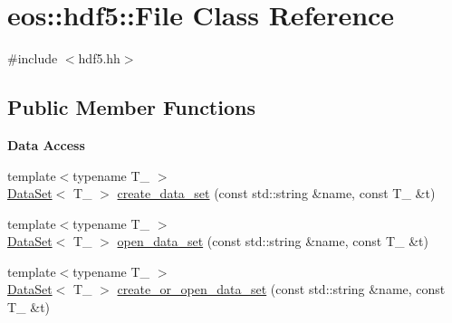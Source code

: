 \hypertarget{classeos_1_1hdf5_1_1File}{
\section{eos::hdf5::File Class Reference}
\label{classeos_1_1hdf5_1_1File}
}


{\ttfamily \#include $<$hdf5.hh$>$}\subsection*{Public Member Functions}
\begin{Indent}{\bf Data Access}\par
{\em \label{_amgrpf8aacfa5c683858912c498f517c9b457}
 }\begin{DoxyCompactItemize}
\item 
{\footnotesize template$<$typename T\_\- $>$ }\\\hyperlink{classeos_1_1hdf5_1_1DataSet}{DataSet}$<$ T\_\- $>$ \hyperlink{classeos_1_1hdf5_1_1File_a6ae5be7fa9d26030daee1e3631a0432f}{create\_\-data\_\-set} (const std::string \&name, const T\_\- \&t)
\item 
{\footnotesize template$<$typename T\_\- $>$ }\\\hyperlink{classeos_1_1hdf5_1_1DataSet}{DataSet}$<$ T\_\- $>$ \hyperlink{classeos_1_1hdf5_1_1File_ae5e5e823024ff7629788895eec1f33f2}{open\_\-data\_\-set} (const std::string \&name, const T\_\- \&t)
\item 
{\footnotesize template$<$typename T\_\- $>$ }\\\hyperlink{classeos_1_1hdf5_1_1DataSet}{DataSet}$<$ T\_\- $>$ \hyperlink{classeos_1_1hdf5_1_1File_a01aeea71760b5ca862900658602b71bd}{create\_\-or\_\-open\_\-data\_\-set} (const std::string \&name, const T\_\- \&t)
\end{DoxyCompactItemize}
\end{Indent}
